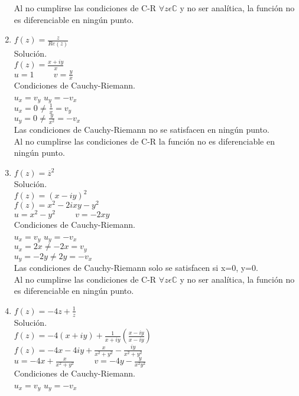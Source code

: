 \begin{enumerate}
Al no cumplirse las condiciones de C-R $\forall z \epsilon \mathbb{C}$ y no ser anal\'itica, la funci\'on no es diferenciable en ning\'un punto.
\item $f(z)= \frac{z}{Re(z)}$\\
Soluci\'on.\\
$f(z)=\frac{x+iy}{x}$\\
$u=1 \hspace{1cm} v=\frac{y}{x}$\\
Condiciones de Cauchy-Riemann.\\
$u_x=v_y$ \hspace{1cm} $u_y=-v_x$\\
$u_x = 0 \neq \frac{1}{x} = v_y$\\
$u_y = 0 \neq \frac{y}{x^2} =-v_x$\\
Las condiciones de Cauchy-Riemann no se satisfacen en ning\'un punto. \\
Al no cumplirse las condiciones de C-R la funci\'on no es diferenciable en ning\'un punto.
\item $f(z)= \overline{z}^2$\\
Soluci\'on.\\
$f(z)=(x-iy)^2$\\
$f(z)=x^2-2ixy-y^2$\\
$u=x^2-y^2 \hspace{1cm} v=-2xy$\\
Condiciones de Cauchy-Riemann.\\
$u_x=v_y$ \hspace{1cm} $u_y=-v_x$\\
$u_x = 2x \neq -2x = v_y$\\
$u_y = -2y \neq 2y =-v_x$\\
Las condiciones de Cauchy-Riemann solo se satisfacen si x=0, y=0. \\
Al no cumplirse las condiciones de C-R $\forall z \epsilon \mathbb{C}$ y no ser anal\'itica, la funci\'on no es diferenciable en ning\'un punto.
\item $f(z)= -4z + \frac{1}{z}$\\
Soluci\'on.\\
$f(z)=-4(x+iy) + \frac{1}{x+iy}(\frac{x-iy}{x-iy})$\\
$f(z)=-4x-4iy + \frac{x}{x^2+y^2}-\frac{iy}{x^2+y^2}$\\
$u=-4x+\frac{x}{x^2+y^2} \hspace{1cm} v=-4y-\frac{y}{x^2y^2}$\\
Condiciones de Cauchy-Riemann.\\
$u_x=v_y$ \hspace{1cm} $u_y=-v_x$\\

\end{enumerate}
